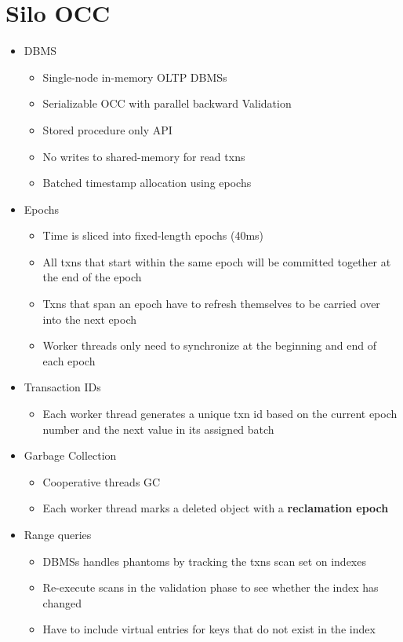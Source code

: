 \documentclass[11pt]{article}
\begin{document}
\section{Silo OCC}
\begin{itemize}
    \item {} DBMS ~\cite{tu-sosp2013}
    \begin{itemize}
        \item Single-node in-memory OLTP DBMSs
        \item Serializable OCC with parallel backward Validation
        \item Stored procedure only API
        \item No writes to shared-memory for read txns
        \item Batched timestamp allocation using epochs
    \end{itemize}
    \item Epochs
    \begin{itemize}
        \item Time is sliced into fixed-length epochs (40ms)
        \item All txns that start within the same epoch will be committed together at the end of the epoch
        \item Txns that span an epoch have to refresh themselves to be carried over into the next epoch
        \item Worker threads only need to synchronize at the beginning and end of each epoch
    \end{itemize}
    \item Transaction IDs
    \begin{itemize}
        \item Each worker thread generates a unique txn id based on the current epoch number and the next value in its assigned batch
    \end{itemize}
    \item Garbage Collection
    \begin{itemize}
        \item Cooperative threads GC
        \item Each worker thread marks a deleted object with a \textbf{reclamation epoch}
    \end{itemize}
    \item Range queries
    \begin{itemize}
        \item DBMSs handles phantoms by tracking the txns scan set on indexes
        \item Re-execute scans in the validation phase to see whether the index has changed
        \item Have to include virtual entries for keys that do not exist in the index
    \end{itemize}
\end{itemize}

\newpage


\end{document}
